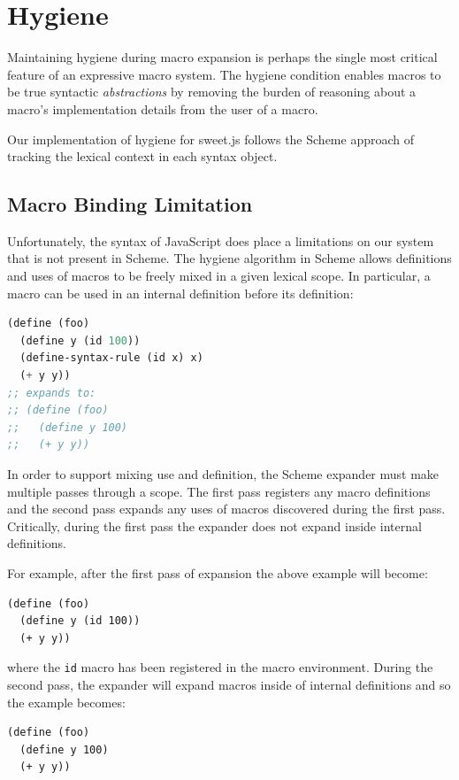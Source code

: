 \documentclass[9pt]{sigplanconf}
\begin{document}


\section{Hygiene}
\label{sec:hygiene}

Maintaining hygiene during macro expansion is perhaps the single most
critical feature of an expressive macro system. The hygiene condition
enables macros to be true syntactic \emph{abstractions} by removing
the burden of reasoning about a macro's implementation details from the
user of a macro.

Our implementation of hygiene for sweet.js follows the Scheme approach
\cite{Hieb1992,Flatt2012} of tracking the lexical context in each
syntax object.

\subsection{Macro Binding Limitation} 
\label{sec:macroBinding}

Unfortunately, the syntax of JavaScript does place a limitations on
our system that is not present in Scheme. The hygiene algorithm in
Scheme allows definitions and uses of macros to be freely mixed in a
given lexical scope. In particular, a macro can be used in an internal
definition before its definition:

\begin{lstlisting}[language=lisp]
(define (foo)
  (define y (id 100))
  (define-syntax-rule (id x) x)
  (+ y y))
;; expands to:
;; (define (foo)
;;   (define y 100)
;;   (+ y y))
\end{lstlisting}

In order to support mixing use and definition, the Scheme expander
must make multiple passes through a scope. The first pass registers
any macro definitions and the second pass expands any uses of macros
discovered during the first pass. Critically, during the first
pass the expander does not expand inside internal definitions.

For example, after the first pass of expansion the above example will become:
\begin{lstlisting}
(define (foo)
  (define y (id 100))
  (+ y y))
\end{lstlisting}
where the \verb!id! macro has been registered in the macro
environment. During the second pass, the expander will expand macros
inside of internal definitions and so the example becomes:
\begin{lstlisting}
(define (foo)
  (define y 100)
  (+ y y))
\end{lstlisting}
\end{document}

